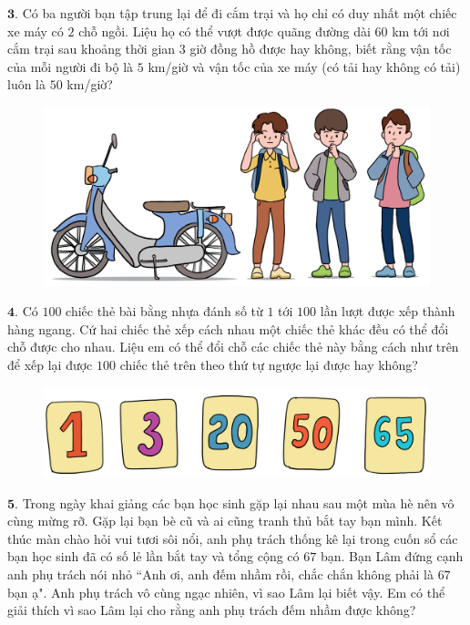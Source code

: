 \begin{multicols}{2}
\begin{figure}[H]
		\vspace*{-10pt}
	\end{figure}
	\vskip 0.1cm
	$\pmb{3.}$ Có ba người bạn tập trung lại để đi cắm trại và họ chỉ có duy nhất một chiếc xe máy có $2$ chỗ ngồi. Liệu họ có thể vượt được quãng đường dài $60$ km tới nơi cắm trại sau khoảng thời gian $3$ giờ đồng hồ được hay không, biết rằng vận tốc của mỗi người đi bộ là $5$ km/giờ và vận tốc của xe máy (có tải hay không có tải) luôn là $50$ km/giờ?
	\begin{figure}[H]
		\centering
		\vspace*{-5pt}
		\captionsetup{labelformat= empty, justification=centering}
		\includegraphics[width=1\linewidth]{Pi10_ToanBi_Bai3}
		\vspace*{-15pt}
	\end{figure}
	$\pmb{4.}$ Có $100$ chiếc thẻ bài bằng nhựa đánh số từ $1$ tới $100$ lần lượt được xếp thành hàng ngang. Cứ hai chiếc thẻ xếp cách nhau một chiếc thẻ khác đều có thể đổi chỗ được cho nhau. Liệu em có thể đổi chỗ các chiếc thẻ này bằng cách như trên để xếp lại được $100$ chiếc thẻ trên theo thứ tự ngược lại được hay không?
	\begin{figure}[H]
		\centering
		\vspace*{-5pt}
		\captionsetup{labelformat= empty, justification=centering}
		\includegraphics[width=1\linewidth]{Pi10_ToanBi_Bai4}
		\vspace*{-15pt}
	\end{figure}
	$\pmb{5.}$ Trong ngày khai giảng các bạn học sinh gặp lại nhau sau một mùa hè nên vô cùng mừng rỡ. Gặp lại bạn bè cũ và ai cũng tranh thủ bắt tay bạn mình. Kết thúc màn chào hỏi vui tươi sôi nổi, anh phụ trách thống kê lại trong cuốn sổ các bạn học sinh đã có số lẻ lần bắt tay và tổng cộng có $67$ bạn. Bạn Lâm đứng cạnh anh phụ trách nói nhỏ ``Anh ơi, anh đếm nhầm rồi, chắc chắn không phải là $67$ bạn ạ". Anh phụ trách vô cùng ngạc nhiên, vì sao Lâm lại biết vậy. Em có thể giải thích vì sao Lâm lại cho rằng anh phụ trách đếm nhầm được không?

\end{multicols}
